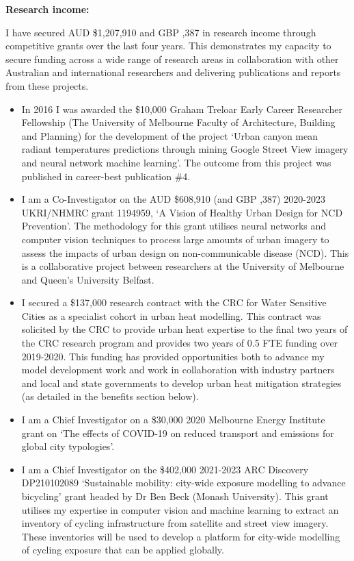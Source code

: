 \textbf{Research income:}

I have secured AUD \$1,207,910 and GBP ,387 in research income through competitive grants over the last four years. This demonstrates my capacity to secure funding across a wide range of research areas in collaboration with other Australian and international researchers and delivering publications and reports from these projects.

\begin{itemize}
\item In 2016 I was awarded the \$10,000 Graham Treloar Early Career Researcher Fellowship (The University of Melbourne Faculty of Architecture, Building and Planning) for the development of the project `Urban canyon mean radiant temperatures predictions through mining Google Street View imagery and neural network machine learning'. The outcome from this project was published in career-best publication \#4.

\item I am a Co-Investigator on the AUD \$608,910 (and GBP ,387) 2020-2023 UKRI/NHMRC grant 1194959, `A Vision of Healthy Urban Design for NCD Prevention'. The methodology for this grant utilises neural networks and computer vision techniques to process large amounts of urban imagery to assess the impacts of urban design on non-communicable disease (NCD). This is a collaborative project between researchers at the University of Melbourne and Queen's University Belfast.

\item I secured a \$137,000 research contract with the CRC for Water Sensitive Cities as a specialist cohort in urban heat modelling. This contract was solicited by the CRC to provide urban heat expertise to the final two years of the CRC research program and provides two years of 0.5 FTE funding over 2019-2020. This funding has provided opportunities both to advance my model development work and work in collaboration with industry partners and local and state governments to develop urban heat mitigation strategies (as detailed in the benefits section below).

\item I am a Chief Investigator on a \$30,000 2020 Melbourne Energy Institute grant on `The effects of COVID-19 on reduced transport and emissions for global city typologies'. 

\item I am a Chief Investigator on the \$402,000 2021-2023 ARC Discovery DP210102089 `Sustainable mobility: city-wide exposure modelling to advance bicycling' grant headed by Dr Ben Beck (Monash University). This grant utilises my expertise in computer vision and machine learning to extract an inventory of cycling infrastructure from satellite and street view imagery. These inventories will be used to develop a platform for city-wide modelling of cycling exposure that can be applied globally.
\end{itemize}



